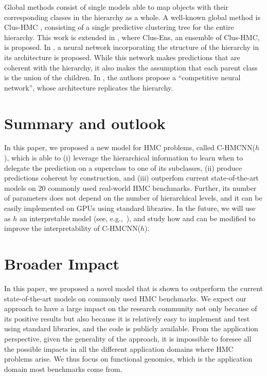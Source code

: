 \documentclass{article}
\newcommand{\module}{\text{MCM}}
\newcommand{\loss}{\text{MCLoss}}
\newcommand{\system}[1]{C-HMCNN(#1)}
\newcommand{\ens}{{Clus-Ens}}
\begin{document}
Global methods consist of single models able to map objects with their corresponding classes in the hierarchy as a whole. A well-known global method is {\sc Clus-HMC} \citep{vens2008}, consisting of a single predictive clustering tree for the entire hierarchy. This work is extended in \citep{schietgat2010}, where \ens{}, an ensemble of {\sc Clus-HMC}, is proposed. In \cite{masera2018}, a neural network incorporating the structure of the hierarchy in its architecture is proposed. While this network makes predictions that are coherent with the hierarchy, it also makes the assumption that each parent class is the union of the children. In \cite{borges2012}, the authors propose a ``competitive neural network'', whose architecture replicates the hierarchy.





\section{Summary and outlook}\label{sec:conclusions}


In this paper, we proposed a new model for HMC problems, called \system{$h$}, which is able to (i) leverage the hierarchical information to learn when to delegate the prediction on a superclass to one of its subclasses, (ii) produce predictions coherent by construction, and (iii) outperfom current state-of-the-art models on 20 commonly used real-world HMC benchmarks. Further, its number of parameters does not depend on the number of hierarchical levels, and it can be easily implemented on GPUs using standard libraries. In the future, we will use as $h$ an interpretable model (see, e.g.,~\cite{lei2016}), and study how \module{} and \loss{} can be modified to improve the interpretability of \system{$h$}.







\section*{Broader Impact}



In this paper, we proposed a novel model that is shown to outperform the current state-of-the-art models on commonly used HMC benchmarks. We expect our approach to have a large impact on the research community not only because of its positive results but also because it is relatively easy to implement and test using standard libraries, and the code is publicly available. From the application perspective, given the generality of the approach, it is impossible to foresee all the possible impacts in all the different application domains where HMC problems arise.  We thus focus on functional genomics, which is the application domain most benchmarks come from. 
\end{document}
